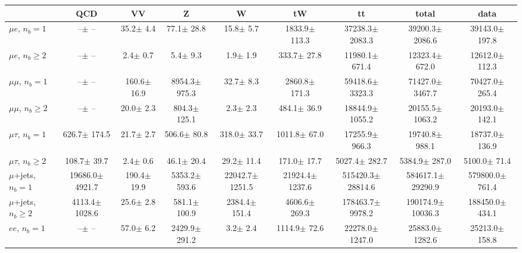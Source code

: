\begin{sidewaystable}[p]
    \centering
    \setlength{\tabcolsep}{0.4em}
    \renewcommand{\arraystretch}{2}
    \small
    \begin{tabular}{l|cccccc|cc}
    \hline
        & QCD & VV  & Z & W & tW & tt & total & data      \\
    \hline
    
    $\mu e$, $n_b=1$                   &       --$\pm$     -- &     35.2$\pm$    4.4 &     77.1$\pm$   28.8 &     15.8$\pm$    5.7 &   1833.9$\pm$  113.3 &  37238.3$\pm$ 2083.3 &  39200.3$\pm$ 2086.6 &  39143.0$\pm$  197.8 \\ 
    $\mu e$, $n_b\geq2$                &       --$\pm$     -- &      2.4$\pm$    0.7 &      5.4$\pm$    9.3 &      1.9$\pm$    1.9 &    333.7$\pm$   27.8 &  11980.1$\pm$  671.4 &  12323.4$\pm$  672.0 &  12612.0$\pm$  112.3 \\ 
    \hline
    $\mu\mu$, $n_b=1$                  &       --$\pm$     -- &    160.6$\pm$   16.9 &   8954.3$\pm$  975.3 &     32.7$\pm$    8.3 &   2860.8$\pm$  171.3 &  59418.6$\pm$ 3323.3 &  71427.0$\pm$ 3467.7 &  70427.0$\pm$  265.4 \\ 
    $\mu\mu$, $n_b\geq2$               &       --$\pm$     -- &     20.0$\pm$    2.3 &    804.3$\pm$  125.1 &      2.3$\pm$    2.3 &    484.1$\pm$   36.9 &  18844.9$\pm$ 1055.2 &  20155.5$\pm$ 1063.2 &  20193.0$\pm$  142.1 \\ 
    \hline
    $\mu\tau$, $n_b=1$                 &    626.7$\pm$  174.5 &     21.7$\pm$    2.7 &    506.6$\pm$   80.8 &    318.0$\pm$   33.7 &   1011.8$\pm$   67.0 &  17255.9$\pm$  966.3 &  19740.8$\pm$  988.1 &  18737.0$\pm$  136.9 \\ 
    $\mu\tau$, $n_b\geq2$              &    108.7$\pm$   39.7 &      2.4$\pm$    0.6 &     46.1$\pm$   20.4 &     29.2$\pm$   11.4 &    171.0$\pm$   17.7 &   5027.4$\pm$  282.7 &   5384.9$\pm$  287.0 &   5100.0$\pm$   71.4 \\ 
    \hline
    $\mu$+jets, $n_b=1$                &  19686.0$\pm$ 4921.7 &    190.4$\pm$   19.9 &   5353.2$\pm$  593.6 &  22042.7$\pm$ 1251.5 &  21924.4$\pm$ 1237.6 & 515420.3$\pm$28814.6 & 584617.1$\pm$29290.9 & 579800.0$\pm$  761.4 \\ 
    $\mu$+jets, $n_b\geq2$             &   4113.4$\pm$ 1028.6 &     25.6$\pm$    2.8 &    581.1$\pm$  100.9 &   2384.4$\pm$  151.4 &   4606.6$\pm$  269.3 & 178463.7$\pm$ 9978.2 & 190174.9$\pm$10036.3 & 188450.0$\pm$  434.1 \\ 
    \hline
    $e e$, $n_b=1$                     &       --$\pm$     -- &     57.0$\pm$    6.2 &   2429.9$\pm$  291.2 &      3.2$\pm$    2.4 &   1114.9$\pm$   72.6 &  22278.0$\pm$ 1247.0 &  25883.0$\pm$ 1282.6 &  25213.0$\pm$  158.8 \\ 

\end{tabular}
\end{sidewaystable}
